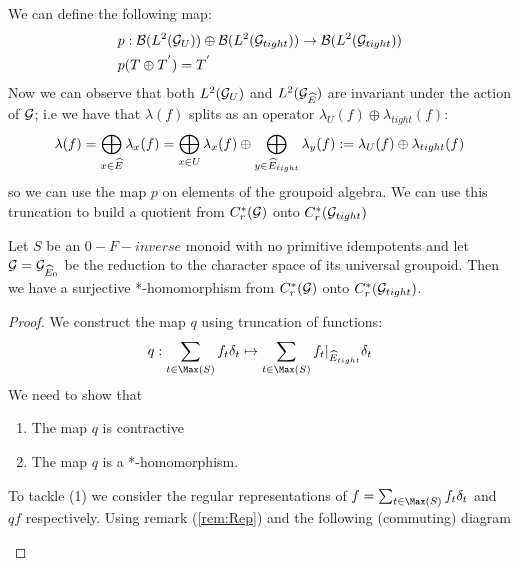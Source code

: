 \begin{corollary}
We can define the following map:
\begin{eqnarray*}\label{eqn:Quotent}
&p:\mathcal{B}(L^{2}(\mathcal{G}_{U})) \oplus\mathcal{B}( L^{2}(\mathcal{G}_{tight})) \rightarrow \mathcal{B}(L^{2}(\mathcal{G}_{tight}))\\
&p(T\oplus T^{'})=T^{'}
\end{eqnarray*}
Now we can observe that both $L^{2}(\mathcal{G}_{U})$ and $L^{2}(\mathcal{G}_{\widehat{E}})$ are invariant under the action of $\mathcal{G}$; i.e we have that $\lambda(f)$ splits as an operator $\lambda_{U}(f)\oplus \lambda_{tight}(f)$:
\begin{equation*}
\lambda(f)=\bigoplus_{x \in \widehat{E}}\lambda_{x}(f)=\bigoplus_{x \in U}\lambda_{x}(f) \oplus \bigoplus_{y \in \widehat{E}_{tight}} \lambda_{y}(f) := \lambda_{U}(f)\oplus \lambda_{tight}(f)
\end{equation*}
so we can use the map $p$ on elements of the groupoid algebra.
We can use this truncation to build a quotient from $C^{*}_{r}(\mathcal{G})$ onto $C^{*}_{r}(\mathcal{G}_{tight})$

\begin{proposition}\label{prop:P4}
Let $S$ be an $0-F-inverse$ monoid with no primitive idempotents and let $\mathcal{G}=\mathcal{G}_{\widehat{E}_{0}}$ be the reduction to the character space of its universal groupoid. Then we have a surjective *-homomorphism from $C^{*}_{r}(\mathcal{G})$ onto $C^{*}_{r}(\mathcal{G}_{tight})$.
\end{proposition}

\begin{proof}
We construct the map $q$ using truncation of functions:
\begin{equation*}
q: \sum_{t \in \Max(S)} f_{t} \delta_{t} \mapsto \sum_{t \in \Max(S)} f_{t}|_{\E_{tight}} \delta_{t} 
\end{equation*}
We need to show that
\begin{enumerate}
\item The map $q$ is contractive
\item The map $q$ is a *-homomorphism.
\end{enumerate}
To tackle (1) we consider the regular representations of $f = \sum_{t \in \Max(S)} f_{t} \delta_{t}$ and $qf$ respectively. Using remark (\ref{rem:Rep}) and the following (commuting) diagram

\begin{center}
\end{center}
\end{proof}
\end{corollary}
